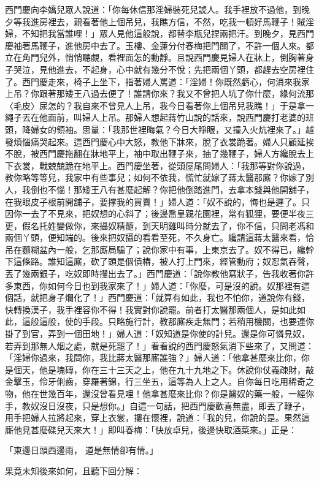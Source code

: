 西門慶向李嬌兒眾人說道：「你每休信那淫婦裝死兒諕人。我手裡放不過他，到晚夕等我進房裡去，親看著他上個吊兒，我瞧方信，不然，吃我一頓好馬鞭子！賊淫婦，不知把我當誰哩！」眾人見他這般說，都替李瓶兒捏兩把汗。到晚夕，見西門慶袖著馬鞭子，進他房中去了。玉樓、金蓮分付春梅把門關了，不許一個人來。都立在角門兒外，悄悄聽覷，看裡面怎的動靜。且說西門慶見婦人在牀上，倒胸著身子哭泣，見他進去，不起身，心中就有幾分不悅；先把兩個丫頭，都趕去空房裡住了。西門慶走來，椅子上坐下，指著婦人罵道：「淫婦！你既然虧心，何消來我家上吊？你跟著那矮王八過去便了！誰請你來？我又不曾把人坑了你什麼，緣何流那〈毛皮〉尿怎的？我自來不曾見人上吊，我今日看著你上個吊兒我瞧！」于是拿一繩子丟在他面前，叫婦人上吊。那婦人想起蔣竹山說的話來，說西門慶打老婆的班頭，降婦女的領袖。思量：「我那世裡晦氣？今日大睜眼，又撞入火炕裡來了。」越發煩惱痛哭起來。這西門慶心中大怒，教他下牀來，脫了衣裳跪著。婦人只顧延挨不脫，被西門慶拖翻在牀地平上，袖中取出鞭子來，抽了幾鞭子，婦人方纔脫去上下衣裳，戰兢兢跪在地平上。西門慶坐著，從頭屋尾問婦人：「我那等對你說過，教你略等等兒，我家中有些事兒；如何不依我，慌忙就嫁了蔣太醫那廝？你嫁了別人，我倒也不惱！那矮王八有甚麼起解？你把他倒踏進門，去拿本錢與他開舖子，在我眼皮子根前開舖子，要撑我的買賣！」婦人道：「奴不說的，悔也是遲了。只因你一去了不見來，把奴想的心斜了；後邊喬皇親花園裡，常有狐狸，要便半夜三更，假名托姓變做你，來攝奴精髓，到天明雞叫時分就去了，你不信，只問老馮和兩個丫頭，便知端的。後來把奴攝的看看至死，不久身亡。纔請這蔣太醫來看，恰吊在麵糊盆內一般，乞那廝局騙了；說你家中有事，上東京去了。奴不得已，纔幹下這條路。誰知這廝，砍了頭是個債樁，被人打上門來，經管動府；奴忍氣吞聲，丟了幾兩銀子，吃奴即時攆出去了。」西門慶道：「說你教他寫狀子，告我收著你許多東西，你如何今日也到我家來了！」婦人道：「你麼，可是沒的說。奴那裡有這個話，就把身子爛化了！」西門慶道：「就算有如此，我也不怕你，道說你有錢，快轉換漢子，我手裡容你不得！我實對你說罷。前者打太醫那兩個人，是如此如此，這般這般，使的手段。只略施行計，教那廝疾走無門；若稍用機關，也要連你掛了到官，弄到一個田地！」婦人道：「奴知道是你使的計兒。還是你可憐見奴，若弄到那無人烟之處，就是死罷了！」看看說的西門慶怒氣消下些來了，又問道：「淫婦你過來，我問你，我比蔣太醫那廝誰強？」婦人道：「他拿甚麼來比你，你是個天，他是塊磚，你在三十三天之上，他在九十九地之下。休說你仗義疎財，敲金擊玉，伶牙俐齒，穿羅著錦，行三坐五，這等為人上之人。自你每日吃用稀奇之物，他在世幾百年，還沒曾看見哩！他拿甚麼來比你？你是醫奴的藥一般，一經你手，教奴沒日沒夜，只是想你。」自這一句話，把西門慶歡喜無盡，即丟了鞭子，用手把婦人拉將起來，穿上衣裳，摟在懷裡，說道：「我的兒，你說的是。果然這廝他見甚麼碟兒天來大！」即叫春梅：「快放卓兒，後邊快取酒菜來。」正是：

「東邊日頭西邊雨，  道是無情卻有情。」

果竟未知後來如何，且聽下回分解：
